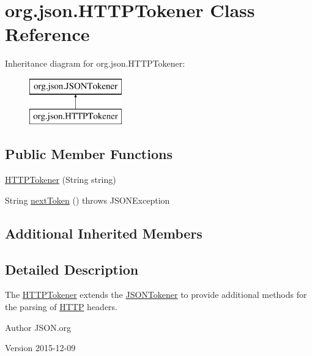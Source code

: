 \hypertarget{classorg_1_1json_1_1HTTPTokener}{\section{org.\-json.\-H\-T\-T\-P\-Tokener Class Reference}
\label{classorg_1_1json_1_1HTTPTokener}
}
Inheritance diagram for org.\-json.\-H\-T\-T\-P\-Tokener\-:\begin{figure}[H]
\begin{center}
\leavevmode
\includegraphics[height=2.000000cm]{classorg_1_1json_1_1HTTPTokener}
\end{center}
\end{figure}
\subsection*{Public Member Functions}
\begin{DoxyCompactItemize}
\item 
\hyperlink{classorg_1_1json_1_1HTTPTokener_a60475c4923ebf3ec28ed708bb0e4a6bc}{H\-T\-T\-P\-Tokener} (String string)
\item 
String \hyperlink{classorg_1_1json_1_1HTTPTokener_a7189a17298ad2e09dce28e52bd5ccd07}{next\-Token} ()  throws J\-S\-O\-N\-Exception 
\end{DoxyCompactItemize}
\subsection*{Additional Inherited Members}


\subsection{Detailed Description}
The \hyperlink{classorg_1_1json_1_1HTTPTokener}{H\-T\-T\-P\-Tokener} extends the \hyperlink{classorg_1_1json_1_1JSONTokener}{J\-S\-O\-N\-Tokener} to provide additional methods for the parsing of \hyperlink{classorg_1_1json_1_1HTTP}{H\-T\-T\-P} headers. \begin{DoxyAuthor}{Author}
J\-S\-O\-N.\-org 
\end{DoxyAuthor}
\begin{DoxyVersion}{Version}
2015-\/12-\/09 
\end{DoxyVersion}


